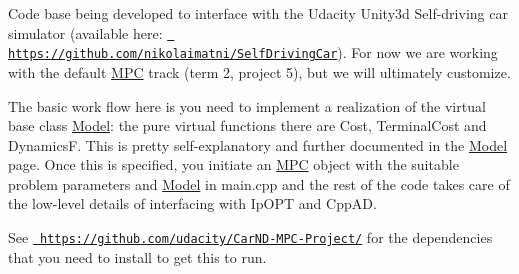 Code base being developed to interface with the Udacity Unity3d Self-\/driving car simulator (available here\+: \href{https://github.com/nikolaimatni/SelfDrivingCar}\texttt{ https\+://github.\+com/nikolaimatni/\+Self\+Driving\+Car}). For now we are working with the default \mbox{\hyperlink{classMPC}{M\+PC}} track (term 2, project 5), but we will ultimately customize.

The basic work flow here is you need to implement a realization of the virtual base class \mbox{\hyperlink{classModel}{Model}}\+: the pure virtual functions there are Cost, Terminal\+Cost and DynamicsF. This is pretty self-\/explanatory and further documented in the \mbox{\hyperlink{classModel}{Model}} page. Once this is specified, you initiate an \mbox{\hyperlink{classMPC}{M\+PC}} object with the suitable problem parameters and \mbox{\hyperlink{classModel}{Model}} in main.\+cpp and the rest of the code takes care of the low-\/level details of interfacing with Ip\+O\+PT and Cpp\+AD.

See \href{https://github.com/udacity/CarND-MPC-Project/}\texttt{ https\+://github.\+com/udacity/\+Car\+N\+D-\/\+M\+P\+C-\/\+Project/} for the dependencies that you need to install to get this to run. 